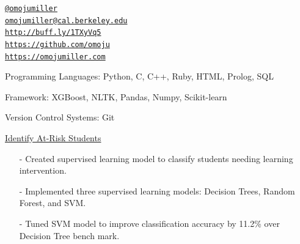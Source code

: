 \documentclass[11pt,article,oneside]{memoir}
\makeatletter
\def\myemail{omojumiller@cal.berkeley.edu}
\def\myweb{https://omojumiller.com}
\def\mytwitter{@omojumiller}
\def\mylinkedin{http://buff.ly/1TXyVq5}
\def\mygithub{https://github.com/omoju}
\makeatother
\begin{document}
\begin{minipage}[t]{2.95in}
  
\end{minipage}
\hfill     
\hfill
\begin{minipage}[t]{1.6in}
  \flushright \footnotesize  \addressblock 
  {\scriptsize  \texttt{\href{http://twitter.com/omojumiller}{\mytwitter}} \, \faTwitter }  \\ 
  {\scriptsize  \texttt{\href{mailto:\myemail}{\myemail}} \, \faEnvelope} \\
  {\scriptsize  \texttt{\href{\mylinkedin}{\mylinkedin}} \, \faLinkedin} \\
  {\scriptsize  \texttt{\href{\mygithub}{\mygithub}} \, \faGithub} \\
  {\scriptsize  \texttt{\href{\myweb}{\myweb}} \, \faGlobe}
\end{minipage}

\medskip

\reversemarginpar

\bigskip       

\medskip

\ind Programming Languages: Python, C, C++, Ruby, HTML, Prolog, SQL

\ind Framework: XGBoost, NLTK, Pandas, Numpy, Scikit-learn

\ind Version Control Systems: Git


\medskip

\ind \href{https://github.com/omoju/studentIntervention}{Identify At-Risk Students}
\begin{itemize}[noitemsep,nolistsep]
\item[-] Created supervised learning model to classify students needing learning intervention. 
\item[-] Implemented three supervised learning models: Decision Trees, Random Forest, and SVM.
\item[-] Tuned SVM model to improve classification accuracy by 11.2\% over Decision Tree bench mark.
\end{itemize} 
\end{document}

